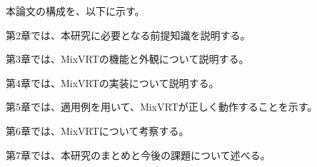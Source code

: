 
\par
本論文の構成を、以下に示す。\par
第2章では、本研究に必要となる前提知識を説明する。\par
第3章では、MixVRTの機能と外観について説明する。\par
第4章では、MixVRTの実装について説明する。\par
第5章では、適用例を用いて、MixVRTが正しく動作することを示す。\par
第6章では、MixVRTについて考察する。\par
第7章では、本研究のまとめと今後の課題について述べる。
